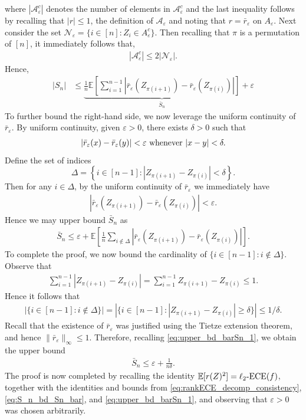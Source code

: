 \documentclass[11pt]{article}
\numberwithin{equation}{section}
\theoremstyle{definition}
\newcommand{\E}{\mathbb{E}}
\newcommand{\cA}{\mathcal{A}}
\newcommand{\cN}{\mathcal{N}}
\newcommand{\vep}{\varepsilon}
\newcommand{\ECE}{\mathrm{ECE}}
\newcommand{\lECE}{\ell_2\textnormal{-}\ECE}
\begin{document}
where $|\cA^c_\vep|$ denotes the number of elements in $\cA^c_\vep$ and the last inequality follows by recalling that $|r|\leq 1$, the definition of $\cA_\vep$ and noting that $r = \bar r_\vep$ on $A_\vep$. Next consider the set $\cN_\vep = \{i\in [n]: Z_i\in A_\vep^c\}$. Then recalling that $\pi$ is a permutation of $[n]$, it immediately follows that,
\begin{align*}
    |\cA_\vep^c|\leq 2|\cN_\vep|.
\end{align*}
Hence,
\begin{align}\label{eq:S_n_bd_Sn_bar}
    |S_n|
    &\leq \underbrace{\frac{1}{n}\E\left[\sum_{i=1}^{n-1}\left|\bar r_\vep\left(Z_{\pi(i+1)}\right) - \bar r_\vep\left(Z_{\pi(i)}\right)\right|\right]}_{\bar S_n} + \vep
\end{align}
To further bound the right-hand side, we now leverage the uniform continuity of $\bar r_\vep$. By uniform continuity, given $\vep>0$, there exists $\delta>0$ such that
\begin{align*}
    \left|\bar r_\vep(x) - \bar r_\vep(y)\right|< \vep\textnormal{ whenever }|x-y|< \delta.
\end{align*}
Define the set of indices
\[
\Delta = \left\{i\in [n-1]: \left|Z_{\pi(i+1)} - Z_{\pi(i)}\right|<\delta\right\}.
\]
Then for any $i\in \Delta$, by the uniform continuity of $\bar r_\vep$ we immediately have
\begin{align*}
    \left|\bar r_\vep\left(Z_{\pi(i+1)}\right) - \bar r_\vep\left(Z_{\pi(i)}\right)\right|<\vep.
\end{align*}
Hence we may upper bound $\bar S_n$ as
\begin{align}\label{eq:upper_bd_barSn_1}
    \bar S_n \leq \vep + \E\left[\frac{1}{n}\sum_{i\not\in \Delta}\left|\bar r_\vep\left(Z_{\pi(i+1)}\right) - \bar r_\vep\left(Z_{\pi(i)}\right)\right|\right].
\end{align}
To complete the proof, we now bound the cardinality of $\{i\in [n-1]:i\not\in \Delta\}$. Observe that
\begin{align*}
    \sum_{i=1}^{n-1}\left|Z_{\pi(i+1)} - Z_{\pi(i)}\right| = \sum_{i=1}^{n-1}Z_{\pi(i+1)} - Z_{\pi(i)}\leq 1.
\end{align*}
Hence it follows that
\begin{align*}
    \left|\{i\in [n-1]:i\not\in \Delta\}\right| = |\{i\in [n-1]: \left|Z_{\pi(i+1)} - Z_{\pi(i)}\right|\geq \delta\}|\leq 1/\delta.
\end{align*}
Recall that the existence of $\bar r_\vep$ was justified using the Tietze extension theorem, and hence $\|\bar r_\vep\|_\infty\leq 1$. Therefore, recalling \eqref{eq:upper_bd_barSn_1}, we obtain the upper bound
\begin{align*}
    \bar S_n \leq \vep + \frac{1}{n\delta}. 
\end{align*}
The proof is now completed by recalling the identity $\E[r(Z)^2] = \lECE(f)$, together with the identities and bounds from \eqref{eq:rankECE_decomp_consistency}, \eqref{eq:S_n_bd_Sn_bar}, and \eqref{eq:upper_bd_barSn_1}, and observing that $\vep>0$ was chosen arbitrarily.
\end{document}
